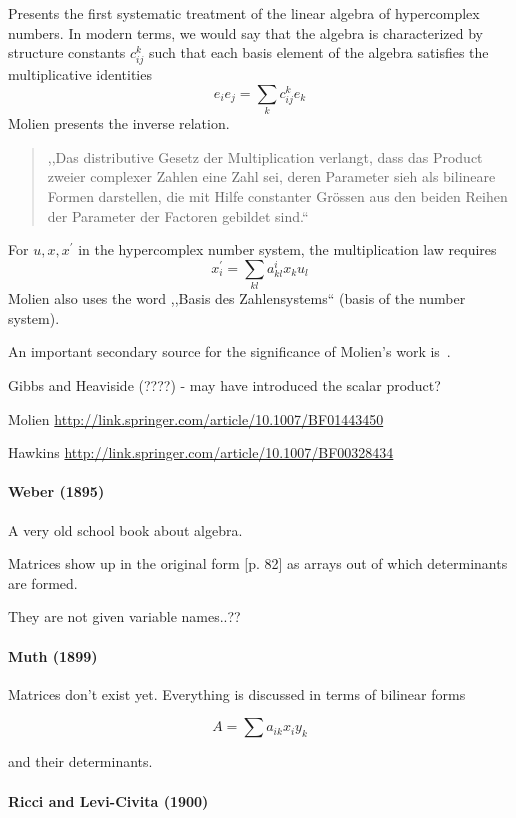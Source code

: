 Presents the first systematic treatment of the linear algebra of hypercomplex numbers.
In modern terms, we would say that the algebra is characterized by structure constants $c_{ij}^k$ such that each basis element of the algebra satisfies the multiplicative identities
\[
e_i e_j = \sum_k c^k_{ij} e_k
\]
Molien presents the inverse relation.
\begin{quote}
,,Das distributive Gesetz der Multiplication verlangt, dass das Product
zweier complexer Zahlen eine Zahl sei, deren Parameter sieh als bilineare
Formen darstellen, die mit Hilfe constanter Grössen aus den beiden
Reihen der Parameter der Factoren gebildet sind.``
\end{quote}
For $u, x, x^\prime$ in the hypercomplex number system, the multiplication law
requires
\[
x_i^\prime = \sum_{kl} a^i_{kl} x_k u_l
\]
Molien also uses the word ,,Basis des Zahlensystems`` (basis of the number system).

An important secondary source for the significance of Molien's work is~\cite{Hawkins1972}.

Gibbs and Heaviside (????) - may have introduced the scalar product?

Molien \url{http://link.springer.com/article/10.1007/BF01443450}

Hawkins \url{http://link.springer.com/article/10.1007/BF00328434}

\paragraph{Weber (1895)~\cite{Weber1895}}

A very old school book about algebra.

Matrices show up in the original form [p. 82] as arrays out of which determinants are formed.

They are not given variable names..??

\paragraph{Muth (1899)~\cite{Muth1899}}

Matrices don't exist yet. Everything is discussed in terms of bilinear forms

\[
A = \sum a_{ik} x_i y_k
\]

and their determinants.


\paragraph{Ricci and Levi-Civita (1900)~\cite{Ricci1900,Hermann1975}}

